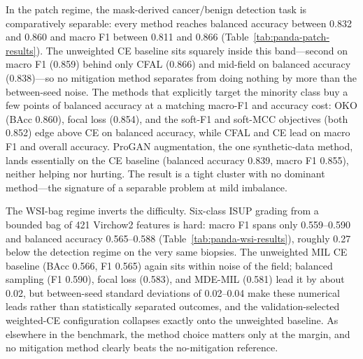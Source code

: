 \documentclass[11pt]{article}
\begin{document}
In the patch regime, the mask-derived cancer/benign detection task is comparatively separable: every method reaches balanced accuracy between \num{0.832} and \num{0.860} and macro F1 between \num{0.811} and \num{0.866} (Table~\ref{tab:panda-patch-results}). The unweighted CE baseline sits squarely inside this band---second on macro F1 (\num{0.859}) behind only CFAL (\num{0.866}) and mid-field on balanced accuracy (\num{0.838})---so no mitigation method separates from doing nothing by more than the between-seed noise. The methods that explicitly target the minority class buy a few points of balanced accuracy at a matching macro-F1 and accuracy cost: OKO (BAcc \num{0.860}), focal loss (\num{0.854}), and the soft-F1 and soft-MCC objectives (both \num{0.852}) edge above CE on balanced accuracy, while CFAL and CE lead on macro F1 and overall accuracy. ProGAN augmentation, the one synthetic-data method, lands essentially on the CE baseline (balanced accuracy \num{0.839}, macro F1 \num{0.855}), neither helping nor hurting. The result is a tight cluster with no dominant method---the signature of a separable problem at mild imbalance.

The WSI-bag regime inverts the difficulty. Six-class ISUP grading from a bounded bag of \num{421} Virchow2 features is hard: macro F1 spans only \num{0.559}--\num{0.590} and balanced accuracy \num{0.565}--\num{0.588} (Table~\ref{tab:panda-wsi-results}), roughly \num{0.27} below the detection regime on the very same biopsies. The unweighted MIL CE baseline (BAcc \num{0.566}, F1 \num{0.565}) again sits within noise of the field; balanced sampling (F1 \num{0.590}), focal loss (\num{0.583}), and MDE-MIL (\num{0.581}) lead it by about \num{0.02}, but between-seed standard deviations of \num{0.02}--\num{0.04} make these numerical leads rather than statistically separated outcomes, and the validation-selected weighted-CE configuration collapses exactly onto the unweighted baseline. As elsewhere in the benchmark, the method choice matters only at the margin, and no mitigation method clearly beats the no-mitigation reference.

\begin{table}[ht]
  \centering
  \caption{PANDA native patch-feature test results (cancer vs.\ benign tiles) for validation-selected configurations, mean $\pm$ standard deviation across patient-disjoint seeds.}
  \label{tab:panda-patch-results}
\end{table}
\end{document}
